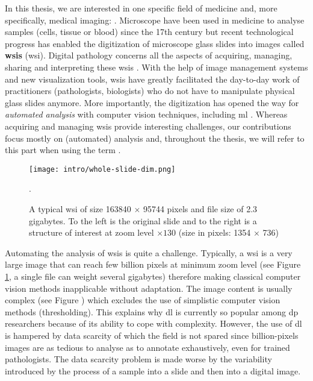 In this thesis, we are interested in one specific field of medicine and, more specifically, medical imaging: . Microscope have been used in medicine to analyse samples (\eg cells, tissue or blood) since the 17th century \parencite{hajdu2002first} but recent technological progress has enabled the digitization of microscope glass slides into images called \textbf{\acrlong{wsi}s} (\acrshort{wsi}). Digital pathology concerns all the aspects of acquiring, managing, sharing and interpreting these \acrshort{wsi}s \parencite{doolan2019whatisdp}. With the help of image management systems and new visualization tools, \acrshort{wsi}s have greatly facilitated the day-to-day work of practitioners (\eg pathologists, biologists) who do not have to manipulate physical glass slides anymore. More importantly, the digitization has opened the way for \textit{automated analysis} with computer vision techniques, including \acrlong{ml} \parencite{ciompi2021editorial}. Whereas acquiring and managing \acrshort{wsi}s provide interesting challenges, our contributions focus mostly on (automated) analysis and, throughout the thesis, we will refer to this part when using the term .

\begin{figure}
  \centering
  \texttt{[image: intro/whole-slide-dim.png]}
  \caption{A typical \acrlong{wsi} of size 163840 $\times$ 95744 pixels and file size of 2.3 gigabytes. To the left is the original slide and to the right is a structure of interest at zoom level $\times130$ (size in pixels: 1354 $\times$ 736)}.
  \label{fig:intro:wsi}
\end{figure}

Automating the analysis of \acrshort{wsi}s is quite a challenge. Typically, a \acrshort{wsi} is a very large image that can reach few billion pixels at minimum zoom level (see Figure \ref{fig:intro:wsi}, a single file can weight several gigabytes) therefore making classical computer vision methods inapplicable without adaptation. The image content is usually complex (see Figure ) which excludes the use of simplistic computer vision methods (\eg thresholding). This explains why \acrlong{dl} is currently so popular among \acrlong{dp} researchers because of its ability to cope with complexity. However, the use of \acrlong{dl} is hampered by data scarcity of which the field is not spared since billion-pixels images are as tedious to analyse as to annotate exhaustively, even for trained pathologists. The data scarcity problem is made worse by the variability introduced by the process of  a sample into a slide and then into a digital image.


